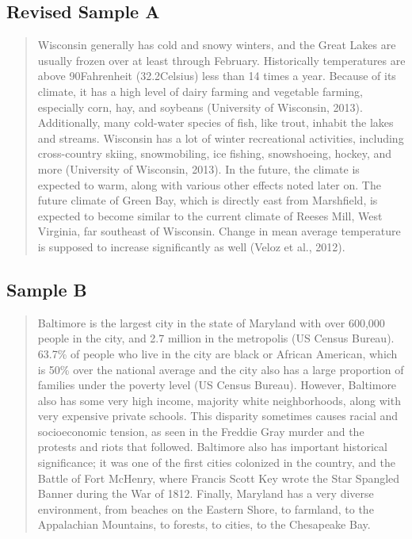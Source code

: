 \documentclass{article}\usepackage[]{graphicx}\usepackage[]{color}
\begin{document}
\subsection{Revised Sample A}

\begin{quote}
Wisconsin generally has cold and snowy winters, and the Great Lakes are usually frozen over at least through February. Historically temperatures are above 90\degree Fahrenheit (32.2\degree Celsius) less than 14 times a year. Because of its climate, it has a high level of dairy farming and vegetable farming, especially corn, hay, and soybeans (University of Wisconsin, 2013). Additionally, many cold-water species of fish, like trout, inhabit the lakes and streams. Wisconsin has a lot of winter recreational activities, including cross-country skiing, snowmobiling, ice fishing, snowshoeing, hockey, and more (University of Wisconsin, 2013). In the future, the climate is expected to warm, along with various other effects noted later on. The future climate of Green Bay, which is directly east from Marshfield, is expected to become similar to the current climate of Reeses Mill, West Virginia, far southeast of Wisconsin. Change in mean average temperature is supposed to increase significantly as well (Veloz et al., 2012). 
\end{quote}


\subsection{Sample B}

\begin{quote}
Baltimore is the largest city in the state of Maryland with over 600,000 people in the city, and 2.7 million in the metropolis (US Census Bureau). 63.7\% of people who live in the city are black or African American, which is 50\% over the national average and the city also has a large proportion of families under the poverty level (US Census Bureau). However, Baltimore also has some very high income, majority white neighborhoods, along with very expensive private schools. This disparity sometimes causes racial and socioeconomic tension, as seen in the Freddie Gray murder and the protests and riots that followed. Baltimore also has important historical significance; it was one of the first cities colonized in the country, and the Battle of Fort McHenry, where Francis Scott Key wrote the Star Spangled Banner during the War of 1812. Finally, Maryland has a very diverse environment, from beaches on the Eastern Shore, to farmland, to the Appalachian Mountains, to forests, to cities, to the Chesapeake Bay.
\end{quote}
\end{document}
